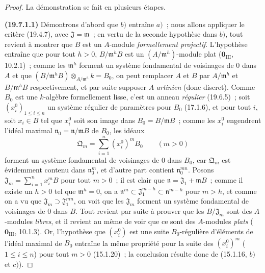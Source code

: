 \begin{proof}
La démonstration se fait en plusieurs étapes.

\medskip
\noindent{}\label{0.19.7.1.1-fr}\textbf{(19.7.1.1)}\enspace
Démontrons d'abord que $b)$ entraîne $a)$~; nous allons appliquer le critère
(19.4.7), avec $\mathfrak J=\mathfrak m$~; en vertu de la seconde hypothèse
dans $b)$, tout revient à montrer que $B$ est un $A$-module
\emph{formellement projectif}. L'hypothèse entraîne que pour tout $h>0$,
$B/\mathfrak m^hB$ est un $(A/\mathfrak m^h)$-module plat
($\mathbf 0_{\mathrm{III}}$, 10.2.1)~; comme les $\mathfrak m^h$ forment un
système fondamental de voisinages de 0 dans $A$ et que
$(B/\mathfrak m^hB)\otimes_{A/\mathfrak m^h}k=B_0$, on peut remplacer $A$ et
$B$ par $A/\mathfrak m^h$ et $B/\mathfrak m^hB$ respectivement, et par suite
supposer $A$ \emph{artinien} (donc discret). Comme $B_0$ est une $k$-algèbre
formellement lisse, c'est un anneau \emph{régulier} (19.6.5)~; soit
$(x_i^0)_{1\leq i\leq n}$ un système régulier de paramètres pour $B_0$
(17.1.6), et pour tout $i$, soit $x_i\in B$ tel que $x_i^0$ soit son image
dans $B_0=B/\mathfrak mB$~; comme les $x_i^0$ engendrent l'idéal maximal
$\mathfrak n_0=\mathfrak n/\mathfrak mB$ de $B_0$, les idéaux
\[
  \mathfrak Q_m=\sum_{i=1}^n(x_i^0)^mB_0 \qquad (m>0)
\]
forment un système fondamental de voisinages de 0 dans $B_0$, car
$\mathfrak Q_m$ est évidemment contenu dans $\mathfrak n_0^m$, et d'autre
part contient $\mathfrak n_0^{mn}$. Posons
$\mathfrak J_m=\sum_{i=1}^n x_i^mB$ pour tout $m>0$~; il est clair que
$\mathfrak n=\mathfrak J_1+\mathfrak mB$~; comme il existe un $h>0$ tel que
$\mathfrak m^h=0$, on a
$\mathfrak n^m\subset\mathfrak J_1^{m-h}\subset\mathfrak n^{m-h}$ pour
$m>h$, et comme on a vu que $\mathfrak J_m\supset\mathfrak J_1^{mn}$, on voit
que les $\mathfrak J_m$ forment un système fondamental de voisinages de 0 dans
$B$. Tout revient par suite à prouver que les $B/\mathfrak J_m$ sont des
$A$-modules \emph{libres}, et il revient au même de voir que ce sont des
$A$-modules \emph{plats} ($\mathbf 0_{\mathrm{III}}$, 10.1.3). Or,
l'hypothèse que $(x_i^0)$ est une suite $B_0$-régulière d'éléments de l'idéal
maximal de $B_0$ entraîne la même propriété pour la suite des $(x_i^0)^m$
($1\leq i\leq n$) pour tout $m>0$ (15.1.20)~; la conclusion résulte donc de
(15.1.16, $b)$ et $c)$).
\end{proof}

